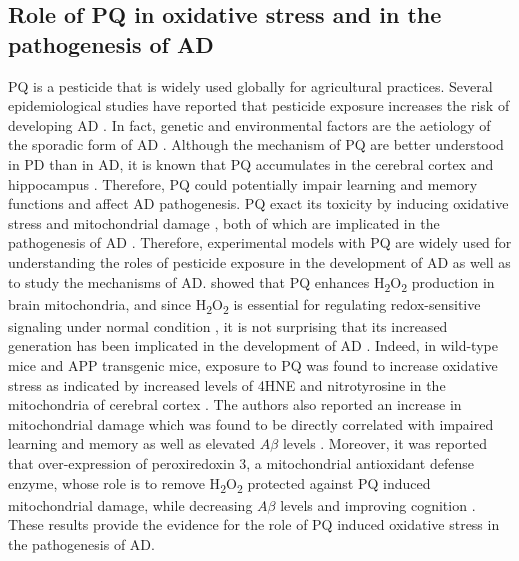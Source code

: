 \subsection{Role of PQ in oxidative stress and in the pathogenesis of AD}
PQ is a pesticide that is widely used globally for agricultural practices. Several epidemiological studies have reported that pesticide exposure increases the risk of developing AD \citep{Baldi2003,Hayden2010,Santibanez2007,Yan2016}. In fact, genetic and environmental factors are the aetiology of the sporadic form of AD \citep{Landrigan2005}. Although the mechanism of PQ are better understood in PD than in AD, it is known that PQ accumulates in the cerebral cortex and hippocampus \citep{Landrigan2005}. Therefore, PQ could potentially impair learning and memory functions and affect AD pathogenesis. PQ exact its toxicity by inducing oxidative stress and mitochondrial damage \citep{Baltazar2014,Drechsel2008,Lin2006}, both of which are implicated in the pathogenesis of AD \citep{Lin2006}. Therefore, experimental models with PQ are widely used for understanding the roles of pesticide exposure in the development of AD as well as to study the mechanisms of AD. \citet{Drechsel2008} showed that PQ enhances H\textsubscript{2}O\textsubscript{2} production in brain mitochondria, and since H\textsubscript{2}O\textsubscript{2} is essential for regulating redox-sensitive signaling under normal condition \citep{Rhee2006}, it is not surprising that its increased generation has been implicated in the development of AD \citep{Du2008,Manczak2006}. Indeed, in wild-type mice and APP transgenic mice, exposure to PQ was found to increase oxidative stress as indicated by increased levels of 4HNE and nitrotyrosine in the mitochondria of cerebral cortex \citep{Chen2012}. The authors also reported an increase in mitochondrial damage which was found to be directly correlated with impaired learning and memory as well as elevated $A\beta$ levels \citep{Chen2012}. Moreover, it was reported that over-expression of peroxiredoxin 3, a mitochondrial antioxidant defense enzyme, whose role is to remove H\textsubscript{2}O\textsubscript{2} protected against PQ induced mitochondrial damage, while decreasing $A\beta$ levels and improving cognition \citep{Chen2012}. These results provide the evidence for the role of PQ induced oxidative stress in the pathogenesis of AD.

